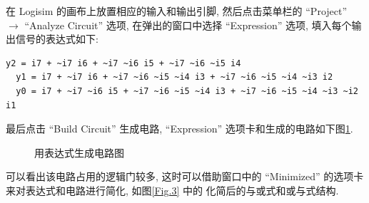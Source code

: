 \documentclass[UTF8,fontset=fandol]{ctexart}
\begin{document}
\begin{ExSteps}
  在 Logisim 的画布上放置相应的输入和输出引脚, 然后点击菜单栏的 ``Project'' $\rightarrow$ ``Analyze Circuit'' 选项, 在弹出的窗口中选择 ``Expression'' 选项, 填入每个输出信号的表达式如下:
  
  \begin{lstlisting}[basicstyle = \small\ttfamily]
  y2 = i7 + ~i7 i6 + ~i7 ~i6 i5 + ~i7 ~i6 ~i5 i4
  y1 = i7 + ~i7 i6 + ~i7 ~i6 ~i5 ~i4 i3 + ~i7 ~i6 ~i5 ~i4 ~i3 i2
  y0 = i7 + ~i7 ~i6 i5 + ~i7 ~i6 ~i5 ~i4 i3 + ~i7 ~i6 ~i5 ~i4 ~i3 ~i2 i1    
  \end{lstlisting}
  
  最后点击 ``Build Circuit'' 生成电路, ``Expression'' 选项卡和生成的电路如下图\ref{Fig.2}.

  \begin{figure}[H]
    \centering
    \caption{用表达式生成电路图}
    \label{Fig.2}
  \end{figure}

  可以看出该电路占用的逻辑门较多, 这时可以借助窗口中的 ``Minimized'' 的选项卡来对表达式和电路进行简化, 如图\ref{Fig.3} 中的
  化简后的与或式和或与式结构.


\end{ExSteps}
\end{document}
